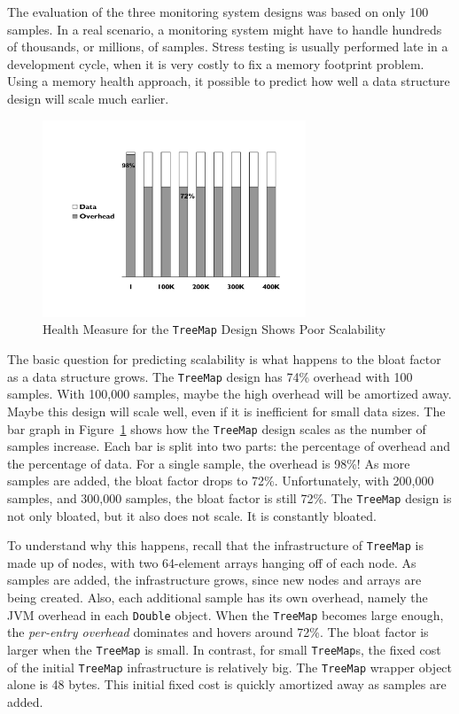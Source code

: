 The evaluation of the three monitoring system designs was based on only 100 samples. In a real scenario, a monitoring system might have to handle hundreds of thousands, or millions, of samples. Stress testing is usually performed late in a development cycle, when it is very costly to fix a memory footprint problem. Using a memory health approach, it possible to predict how well a data structure design will scale much earlier.
 
\begin{figure}
  \centering
   \includegraphics[width=0.7\textwidth]{part1/Figures/memoryhealth/scalable-health-treemap}
  \caption{Health Measure for the \texttt{TreeMap} Design Shows Poor Scalability}
  \label{fig:scalable-health-treemap}
\end{figure}
The basic question for predicting scalability is what happens to the bloat
factor as a data structure grows. The \texttt{TreeMap} design has 74\% overhead
with 100 samples. With 100,000 samples, maybe the high overhead will be amortized away. Maybe this design will scale well, even if it is inefficient for small data sizes. The bar graph in Figure~\ref{fig:scalable-health-treemap} shows how the \texttt{TreeMap} design scales as the number of samples increase. Each bar is split into two parts: the percentage of overhead and the percentage of data. For a single sample, the overhead is 98\%! As more samples are added, the bloat factor drops to 72\%. Unfortunately, with 200,000 samples, and 300,000 samples, the bloat factor is still 72\%. The \texttt{TreeMap} design is not only bloated, but it also does not scale. It is constantly bloated.

To understand why this happens, recall that the infrastructure of \texttt{TreeMap} is made up of nodes, with two 64-element arrays hanging off of each node. As samples are added, the infrastructure grows, since new nodes and arrays are being created. Also, each additional sample has its own overhead, namely the JVM overhead in each \texttt{Double} object. When the \texttt{TreeMap} becomes large enough, the \textit{per-entry overhead} dominates and hovers around 72\%. The bloat factor is larger when the \texttt{TreeMap} is small. In contrast, for small \texttt{TreeMap}s, the fixed cost of the initial \texttt{TreeMap} infrastructure is relatively big. The \texttt{TreeMap} wrapper object alone is 48 bytes. This initial fixed cost is quickly amortized away as samples are added. 

